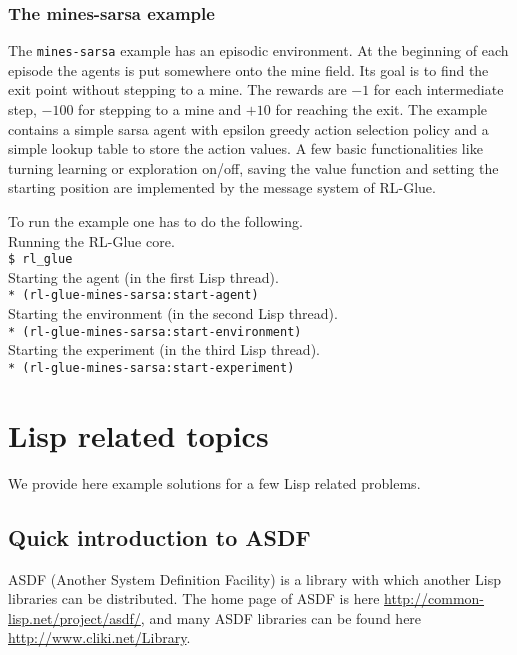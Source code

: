 \documentclass[11pt,a4paper,dvipdfm]{article}
\newcommand{\selfref}[1]{\href{#1}{#1}}
\newcommand{\prompttext}[1]{\texttt{#1}}
\newcommand{\shprompt}[1]{\prompttext{\$ #1}}
\newcommand{\lispprompt}[1]{\prompttext{* #1}}
\begin{document}
\subsubsection{The mines-sarsa example}

The \prompttext{mines-sarsa} example has an episodic environment. At the
beginning of each episode the agents is put somewhere onto the mine field.
Its goal is to find the exit point without stepping to a mine. The rewards
are $-1$ for each intermediate step, $-100$ for stepping to a mine and $+10$
for reaching the exit. The example contains a simple sarsa agent with epsilon
greedy action selection policy and a simple lookup table to store the action
values. A few basic functionalities like turning learning or exploration
on/off, saving the value function and setting the starting position are
implemented by the message system of RL-Glue.

To run the example one has to do the following. \\
Running the RL-Glue core. \\
\shprompt{rl\_glue} \\
Starting the agent (in the first Lisp thread). \\
\lispprompt{(rl-glue-mines-sarsa:start-agent)} \\
Starting the environment (in the second Lisp thread). \\
\lispprompt{(rl-glue-mines-sarsa:start-environment)} \\
Starting the experiment (in the third Lisp thread). \\
\lispprompt{(rl-glue-mines-sarsa:start-experiment)}

\section{Lisp related topics}

We provide here example solutions for a few Lisp related problems.

\hypertarget{asdfintro}{\subsection{Quick introduction to ASDF}}

ASDF (Another System Definition Facility) is a library with which another
Lisp libraries can be distributed. The home page of ASDF is here
\selfref{http://common-lisp.net/project/asdf/}, and many ASDF libraries can
be found here \selfref{http://www.cliki.net/Library}.
\end{document}
